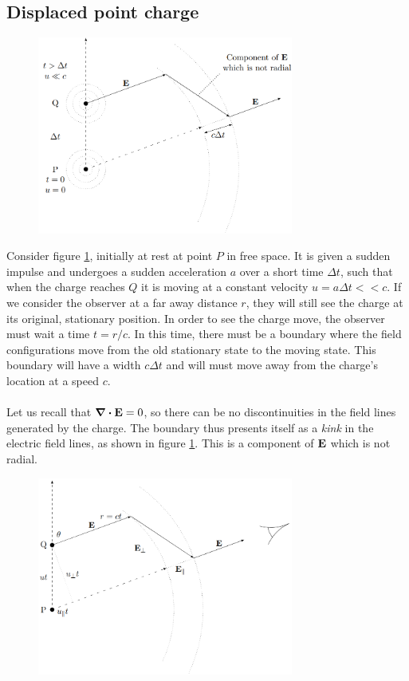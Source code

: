 \documentclass{book}
\begin{document}
\subsection{Displaced point charge}
\begin{figure}
	\centering
	\includegraphics[width=0.75\textwidth]{2.3.png}
	\caption{}
	\label{fig:2.3}
\end{figure}
Consider figure \ref{fig:2.3}, initially at rest at point $P$ in free space. It is given a sudden impulse and undergoes a sudden acceleration $a$ over a short time $\Delta t$, such that when the charge reaches $Q$ it is moving at a constant velocity $u = a\Delta t << c$. If we consider the observer at a far away distance $r$, they will still see the charge at its original, stationary position. In order to see the charge move, the observer must wait a time $t = r/c$. In this time, there must be a boundary where the field configurations move from the old stationary state to the moving state. This boundary will have a width $c\Delta t$ and will must move away from the charge's location at a speed $c$.
\\\\
Let us recall that $\div{\vb{E}} = 0$, so there can be no discontinuities in the field lines generated by the charge. The boundary thus presents itself as a \textit{kink} in the electric field lines, as shown in figure \ref{fig:2.3}. This is a component of $\vb{E}$ which is not radial. 
\begin{figure}
	\centering
	\includegraphics[width=0.75\textwidth]{2.4.png}
	\caption{}
	\label{fig:2.4}
\end{figure}
\end{document}
